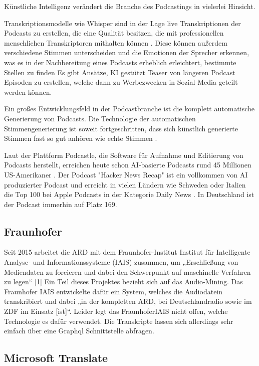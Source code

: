 Künstliche Intelligenz verändert die Branche des Podcastings in vielerlei Hinsicht. 

Transkriptionsmodelle wie Whisper sind in der Lage live Transkriptionen der Podcasts zu erstellen, die eine Qualität besitzen, die mit professionellen menschlichen Transkriptoren mithalten können \cite{radford}.
Diese können außerdem verschiedene Stimmen unterscheiden und die Emotionen der Sprecher erkennen, was es in der Nachbereitung eines Podcasts erheblich erleichtert, bestimmte Stellen zu finden \cite{wagner2023}
Es gibt Ansätze, KI gestützt Teaser von längeren Podcast Episoden zu erstellen, welche dann zu Werbezwecken in Sozial Media geteilt werden können. \cite{wang2023}

Ein großes Entwicklungsfeld in der Podcastbranche ist die komplett automatische Generierung von Podcasts. Die Technologie der automatischen Stimmengenerierung ist soweit fortgeschritten, dass sich künstlich generierte Stimmen fast so gut anhören wie echte Stimmen \cite{shi2023}.

Laut der Plattform Podcastle, die Software für Aufnahme und Editierung von Podcasts herstellt, 
erreichen heute schon AI-basierte Podcasts rund 45 Millionen US-Amerikaner \cite{podcastle2023}.
Der Podcast "Hacker News Recap" ist ein vollkommen von AI produzierter Podcast und erreicht in vielen Ländern wie Schweden oder Italien die Top 100 bei Apple Podcasts in der Kategorie Daily News \cite{chartable}.
In Deutschland ist der Podcast immerhin auf Platz 169.

\subsection{Fraunhofer}

Seit 2015 arbeitet die ARD mit dem Fraunhofer-Institut Institut für Intelligente Analyse- und Informationssysteme (IAIS) zusammen, um „Erschließung von Mediendaten zu forcieren und dabei den Schwerpunkt auf maschinelle Verfahren zu legen“ [1]
Ein Teil dieses Projektes bezieht sich auf das Audio-Mining. 
Das Fraunhofer IAIS entwickelte dafür ein System, welches die Audiodatein transkribiert und dabei „in der kompletten ARD, bei Deutschlandradio sowie im ZDF im Einsatz [ist]“. 
Leider legt das FraunhoferIAIS nicht offen, welche Technologie es dafür verwendet. 
Die Transkripte lassen sich allerdings sehr einfach über eine Graphql Schnittstelle abfragen. 

\subsection{Microsoft Translate}

